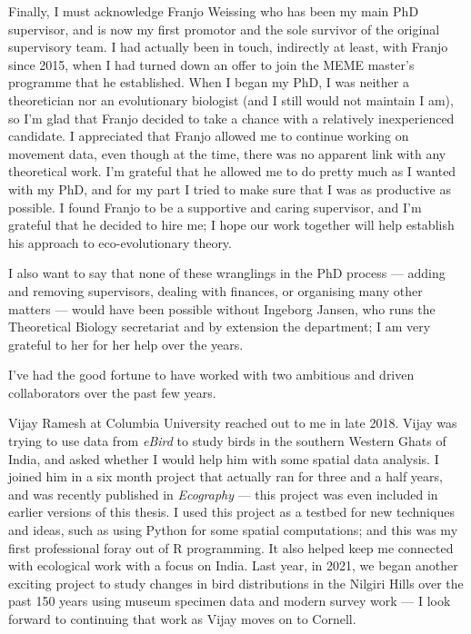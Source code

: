 Finally, I must acknowledge Franjo Weissing who has been my main PhD supervisor, and is now my first promotor and the sole survivor of the original supervisory team.
I had actually been in touch, indirectly at least, with Franjo since 2015, when I had turned down an offer to join the MEME master's programme that he established.
When I began my PhD, I was neither a theoretician nor an evolutionary biologist (and I still would not maintain I am), so I'm glad that Franjo decided to take a chance with a relatively inexperienced candidate.
I appreciated that Franjo allowed me to continue working on movement data, even though at the time, there was no apparent link with any theoretical work.
I'm grateful that he allowed me to do pretty much as I wanted with my PhD, and for my part I tried to make sure that I was as productive as possible.
I found Franjo to be a supportive and caring supervisor, and I'm grateful that he decided to hire me; I hope our work together will help establish his approach to eco-evolutionary theory.

I also want to say that none of these wranglings in the PhD process --- adding and removing supervisors, dealing with finances, or organising many other matters --- would have been possible without Ingeborg Jansen, who runs the Theoretical Biology secretariat and by extension the department; I am very grateful to her for her help over the years.

\medskip

I've had the good fortune to have worked with two ambitious and driven collaborators over the past few years.

\noindent Vijay Ramesh at Columbia University reached out to me in late 2018.
Vijay was trying to use data from \textit{eBird} to study birds in the southern Western Ghats of India, and asked whether I would help him with some spatial data analysis.
I joined him in a six month project that actually ran for three and a half years, and was recently published in \textit{Ecography} --- this project was even included in earlier versions of this thesis.
I used this project as a testbed for new techniques and ideas, such as using Python for some spatial computations; and this was my first professional foray out of R programming.
It also helped keep me connected with ecological work with a focus on India.
Last year, in 2021, we began another exciting project to study changes in bird distributions in the Nilgiri Hills over the past 150 years using museum specimen data and modern survey work --- I look forward to continuing that work as Vijay moves on to Cornell.

